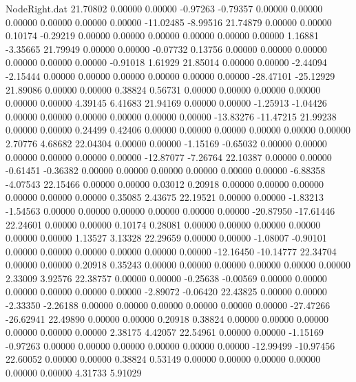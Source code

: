 \begin{filecontents}{NodeRight.dat}
  21.70802    0.00000    0.00000    -0.97263   -0.79357    0.00000    0.00000    0.00000    0.00000    0.00000    0.00000  -11.02485   -8.99516
  21.74879    0.00000    0.00000     0.10174   -0.29219    0.00000    0.00000    0.00000    0.00000    0.00000    0.00000    1.16881   -3.35665
  21.79949    0.00000    0.00000    -0.07732    0.13756    0.00000    0.00000    0.00000    0.00000    0.00000    0.00000   -0.91018    1.61929
  21.85014    0.00000    0.00000    -2.44094   -2.15444    0.00000    0.00000    0.00000    0.00000    0.00000    0.00000  -28.47101  -25.12929
  21.89086    0.00000    0.00000     0.38824    0.56731    0.00000    0.00000    0.00000    0.00000    0.00000    0.00000    4.39145    6.41683
  21.94169    0.00000    0.00000    -1.25913   -1.04426    0.00000    0.00000    0.00000    0.00000    0.00000    0.00000  -13.83276  -11.47215
  21.99238    0.00000    0.00000     0.24499    0.42406    0.00000    0.00000    0.00000    0.00000    0.00000    0.00000    2.70776    4.68682
  22.04304    0.00000    0.00000    -1.15169   -0.65032    0.00000    0.00000    0.00000    0.00000    0.00000    0.00000  -12.87077   -7.26764
  22.10387    0.00000    0.00000    -0.61451   -0.36382    0.00000    0.00000    0.00000    0.00000    0.00000    0.00000   -6.88358   -4.07543
  22.15466    0.00000    0.00000     0.03012    0.20918    0.00000    0.00000    0.00000    0.00000    0.00000    0.00000    0.35085    2.43675
  22.19521    0.00000    0.00000    -1.83213   -1.54563    0.00000    0.00000    0.00000    0.00000    0.00000    0.00000  -20.87950  -17.61446
  22.24601    0.00000    0.00000     0.10174    0.28081    0.00000    0.00000    0.00000    0.00000    0.00000    0.00000    1.13527    3.13328
  22.29659    0.00000    0.00000    -1.08007   -0.90101    0.00000    0.00000    0.00000    0.00000    0.00000    0.00000  -12.16450  -10.14777
  22.34704    0.00000    0.00000     0.20918    0.35243    0.00000    0.00000    0.00000    0.00000    0.00000    0.00000    2.33009    3.92576
  22.38757    0.00000    0.00000    -0.25638   -0.00569    0.00000    0.00000    0.00000    0.00000    0.00000    0.00000   -2.89072   -0.06420
  22.43825    0.00000    0.00000    -2.33350   -2.26188    0.00000    0.00000    0.00000    0.00000    0.00000    0.00000  -27.47266  -26.62941
  22.49890    0.00000    0.00000     0.20918    0.38824    0.00000    0.00000    0.00000    0.00000    0.00000    0.00000    2.38175    4.42057
  22.54961    0.00000    0.00000    -1.15169   -0.97263    0.00000    0.00000    0.00000    0.00000    0.00000    0.00000  -12.99499  -10.97456
  22.60052    0.00000    0.00000     0.38824    0.53149    0.00000    0.00000    0.00000    0.00000    0.00000    0.00000    4.31733    5.91029

\end{filecontents}
